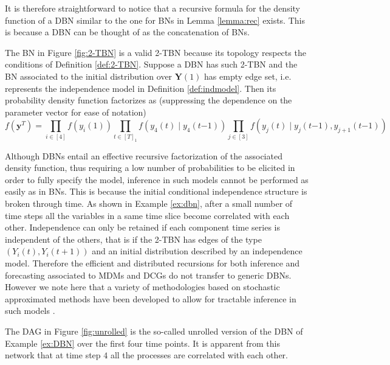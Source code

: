 It is therefore straightforward to notice that a recursive formula for the density function of a \gls{DBN} similar to the one for \glspl{BN} in Lemma \ref{lemma:rec} exists. This is because a \gls{DBN} can be thought of as the concatenation of \glspl{BN}.

\begin{example}
\label{ex:DBN}
The \gls{BN} in Figure \ref{fig:2-TBN} is a valid \gls{2-TBN} because its topology respects the conditions of Definition \ref{def:2-TBN}. Suppose a \gls{DBN} has such \gls{2-TBN} and the \gls{BN} associated to the initial distribution over $\bm{Y}(1)$ has empty edge set, i.e. represents the independence model in Definition \ref{def:indmodel}. Then its probability density function factorizes as (suppressing the dependence on the parameter vector for ease of notation)
\begin{equation*}
\label{eq:exampleDBNfactorization}
f\left(\bm{y}^T\right)=\prod_{i\in[4]}f(y_i(1))\prod_{t\in[T]_1}f(y_4(t)\;|\;y_{4}(t{-1}))\prod_{j\in[3]}f(y_j(t)\;|\;y_{j}(t{-1}),y_{j+1}(t{-1}))
\end{equation*}
\end{example}

Although \glspl{DBN} entail an effective recursive factorization of the associated density function, thus requiring a low number of probabilities to be elicited in order to fully specify the model, inference in such models cannot be performed as easily as in \glspl{BN}. This is because the initial conditional independence structure is broken through time. As shown in Example \ref{ex:dbn}, after a small number of time steps all the variables in a same time slice become correlated with each other. Independence can only be retained if each component time series is independent of the others, that is if the \gls{2-TBN} has edges of the type $(Y_i(t),Y_i(t+1))$ and an initial distribution described by an independence model. Therefore the efficient and distributed recursions for both inference and forecasting associated to \glspl{MDM} and \glspl{DCG} do not transfer to generic \glspl{DBN}. However we note here that a variety of methodologies based on stochastic approximated methods have been developed to allow for tractable inference in such models \citep{Boyen1998, Koller2001}. 

\begin{example}
\label{ex:dbn}
The \gls{DAG} in Figure \ref{fig:unrolled} \citep[from ][]{Boyen1998} is the so-called unrolled version of the \gls{DBN} of Example \ref{ex:DBN} over the first four time points. It is apparent from this network that at time step $4$ all the processes are correlated with each other.
\end{example}

